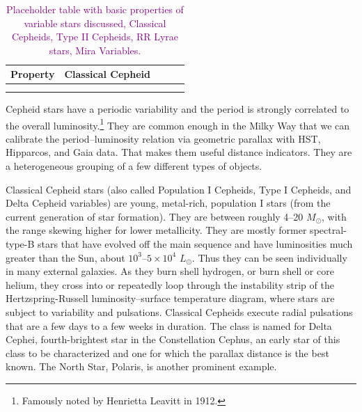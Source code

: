 \begin{table}[t]
  \begin{tabular}{lllll}
    Property & Classical Cepheid \\
    \hline
    \\
    \\
    \hline
  \end{tabular}
  \caption{\textcolor{purple}{Placeholder table with basic properties of variable stars discussed, Classical Cepheids, Type II Cepheids, RR Lyrae stars, Mira Variables.}}
\end{table}


Cepheid stars have a periodic variability and the period is strongly correlated to the overall luminosity.\footnote{Famously noted by Henrietta Leavitt in 1912.}  They are common enough in the Milky Way that we can calibrate the period--luminosity relation via geometric parallax with HST, Hipparcos, and Gaia data.  That makes them useful distance indicators.  They are a heterogeneous grouping of a few different types of objects.


Classical Cepheid stars (also called Population I Cepheids, Type I Cepheids, and Delta Cepheid variables) are young, metal-rich, population I stars (from the current generation of star formation).  They are between roughly 4--20 $M_\odot$, with the range skewing higher for lower  metallicity.  They are mostly former spectral-type-B stars that have evolved off the main sequence and have luminosities much greater than the Sun, about $10^3$--$5\times 10^4$ $L_\odot$.  Thus they can be seen individually in many external galaxies.  As they burn shell hydrogen, or burn shell or core helium, they cross into or repeatedly loop through the instability strip of the Hertzspring-Russell luminosity--surface temperature diagram, where stars are subject to variability and pulsations.  Classical Cepheids execute radial pulsations that are a few days to a few weeks in duration.  The class is named for Delta Cephei, fourth-brightest star in the Constellation Cephus, an early star of this class to be characterized and one for which the parallax distance is the best known. The North Star, Polaris, is another prominent example.


